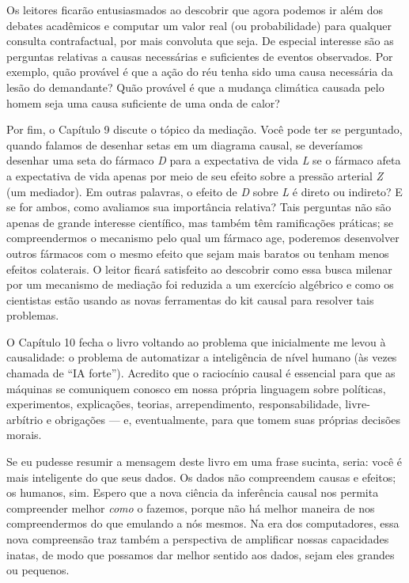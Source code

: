 \documentclass[11pt,a5paper,twoside]{book}
\begin{document}
Os leitores ficarão entusiasmados ao descobrir que agora podemos ir além dos debates acadêmicos e computar um valor real (ou probabilidade) para qualquer consulta contrafactual, por mais convoluta que seja. De especial interesse são as perguntas relativas a causas necessárias e suficientes de eventos observados. Por exemplo, quão provável é que a ação do réu tenha sido uma causa necessária da lesão do demandante? Quão provável é que a mudança climática causada pelo homem seja uma causa suficiente de uma onda de calor?

Por fim, o Capítulo 9 discute o tópico da mediação. Você pode ter se perguntado, quando falamos de desenhar setas em um diagrama causal, se deveríamos desenhar uma seta do fármaco \textit{D} para a expectativa de vida \textit{L} se o fármaco afeta a expectativa de vida apenas por meio de seu efeito sobre a pressão arterial \textit{Z} (um mediador). Em outras palavras, o efeito de \textit{D} sobre \textit{L} é direto ou indireto? E se for ambos, como avaliamos sua importância relativa? Tais perguntas não são apenas de grande interesse científico, mas também têm ramificações práticas; se compreendermos o mecanismo pelo qual um fármaco age, poderemos desenvolver outros fármacos com o mesmo efeito que sejam mais baratos ou tenham menos efeitos colaterais. O leitor ficará satisfeito ao descobrir como essa busca milenar por um mecanismo de mediação foi reduzida a um exercício algébrico e como os cientistas estão usando as novas ferramentas do kit causal para resolver tais problemas.

O Capítulo 10 fecha o livro voltando ao problema que inicialmente me levou à causalidade: o problema de automatizar a inteligência de nível humano (às vezes chamada de “IA forte”). Acredito que o raciocínio causal é essencial para que as máquinas se comuniquem conosco em nossa própria linguagem sobre políticas, experimentos, explicações, teorias, arrependimento, responsabilidade, livre-arbítrio e obrigações — e, eventualmente, para que tomem suas próprias decisões morais.

Se eu pudesse resumir a mensagem deste livro em uma frase sucinta, seria: você é mais inteligente do que seus dados. Os dados não compreendem causas e efeitos; os humanos, sim. Espero que a nova ciência da inferência causal nos permita compreender melhor \textit{como} o fazemos, porque não há melhor maneira de nos compreendermos do que emulando a nós mesmos. Na era dos computadores, essa nova compreensão traz também a perspectiva de amplificar nossas capacidades inatas, de modo que possamos dar melhor sentido aos dados, sejam eles grandes ou pequenos.
\end{document}
